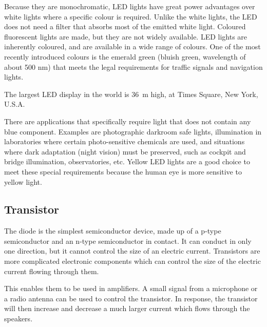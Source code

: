 Because they are monochromatic, LED lights have great power advantages over white lights where a specific colour is required. Unlike the white lights, the LED does not need a filter that absorbs most of the emitted white light. Coloured fluorescent lights are made, but they are not widely available. LED lights are inherently coloured, and are available in a wide range of colours. One of the most recently introduced colours is the emerald green (bluish green, wavelength of about 500 nm) that meets the legal requirements for traffic signals and navigation lights. 

\begin{IFact}{The largest LED display in the world is 36~m high, at Times Square, New York, U.S.A.}
\end{IFact}

There are applications that specifically require light that does not contain any blue component. Examples are photographic darkroom safe lights, illumination in laboratories where certain photo-sensitive chemicals are used, and situations where dark adaptation (night vision) must be preserved, such as cockpit and bridge illumination, observatories, etc. Yellow LED lights are a good choice to meet these special requirements because the human eye is more sensitive to yellow light.


\subsection{Transistor}
The diode is the simplest semiconductor device, made up of a p-type semiconductor and an n-type semiconductor in contact. It can conduct in only one direction, but it cannot control the size of an electric current.  Transistors are more complicated electronic components which can control the size of the electric current flowing through them.  

This enables them to be used in amplifiers.  A small signal from a microphone or a radio antenna can be used to control the transistor.  In response, the transistor will then increase and decrease a much larger current which flows through the speakers.

